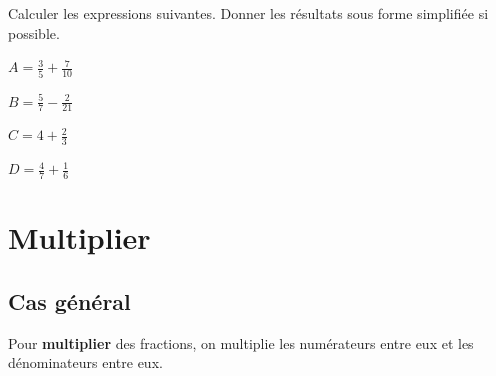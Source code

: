 \documentclass[a4paper]{book}
\begin{document}
\newpage

    
    \begin{exemple}
        Calculer les expressions suivantes. Donner les résultats sous forme simplifiée si possible.\medskip

        \begin{minipage}{0.24\linewidth}
            $A = \frac{3}{5} + \frac{7}{10}$

            \vspace{4cm}
        \end{minipage}
        \hfill\vline \hfill
        \begin{minipage}{0.24\linewidth}
            $B = \frac{5}{7} - \frac{2}{21}$

            \vspace{4cm}
        \end{minipage}
        \hfill\vline \hfill
        \begin{minipage}{0.24\linewidth}
            $C = 4 + \frac{2}{3}$       

            \vspace{4cm}
        \end{minipage}
        \hfill\vline \hfill
        \begin{minipage}{0.24\linewidth}
            $D = \frac{4}{7}+\frac{1}{6}$

            \vspace{4cm}
        \end{minipage}
    \end{exemple}
    
    
\section{Multiplier}
\subsection{Cas général}
    
    \begin{propriete}
        Pour \textbf{multiplier} des fractions, on multiplie les numérateurs entre eux et les dénominateurs entre eux.
    \end{propriete}
\end{document}
